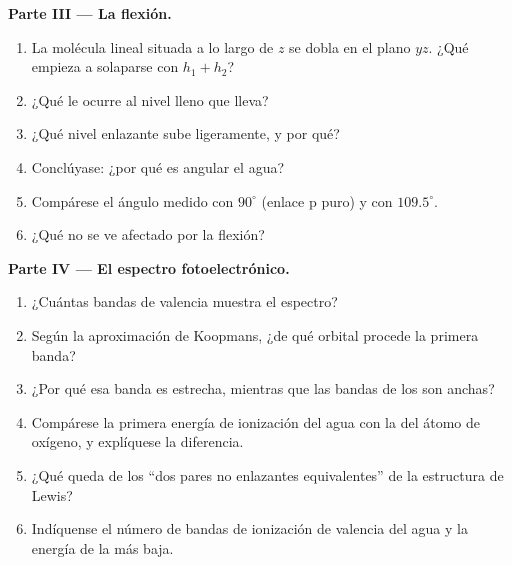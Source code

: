 \begin{problem}
\medskip
\noindent\textbf{Parte III --- La flexión.}
\begin{enumerate}[resume]
  \item La molécula lineal situada a lo largo de $z$ se dobla en el plano $yz$. ¿Qué
         empieza a solaparse con $h_1 + h_2$?
  \item ¿Qué le ocurre al nivel lleno que lleva?
  \item ¿Qué nivel enlazante sube ligeramente, y por qué?
  \item Conclúyase: ¿por qué es angular el agua?
  \item Compárese el ángulo medido con $90^\circ$ (enlace p puro) y con $109.5^\circ$.
  \item ¿Qué  no se ve afectado por la flexión?
\end{enumerate}

\medskip
\noindent\textbf{Parte IV --- El espectro fotoelectrónico.}
\begin{enumerate}[resume]
  \item ¿Cuántas bandas de valencia muestra el espectro?
  \item Según la aproximación de Koopmans, ¿de qué orbital procede la primera banda?
  \item ¿Por qué esa banda es estrecha, mientras que las bandas de los  son anchas?
  \item Compárese la primera energía de ionización del agua con la del átomo de
        oxígeno, y explíquese la diferencia.
  \item ¿Qué queda de los ``dos pares no enlazantes equivalentes'' de la estructura de Lewis?
  \item Indíquense el número de bandas de ionización de valencia del agua y la energía de
        la más baja.
\end{enumerate}
\end{problem}
